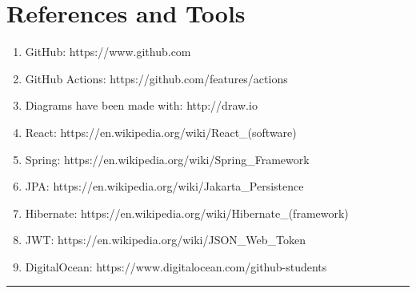 \documentclass{Configuration_Files/Template}
\begin{document}
\section{References and Tools}

\begin{enumerate}
    \item GitHub: https://www.github.com
    \item GitHub Actions: https://github.com/features/actions
    \item Diagrams have been made with: http://draw.io
    \item React: https://en.wikipedia.org/wiki/React\_(software)
    \item Spring: https://en.wikipedia.org/wiki/Spring\_Framework
    \item JPA: https://en.wikipedia.org/wiki/Jakarta\_Persistence
    \item Hibernate: https://en.wikipedia.org/wiki/Hibernate\_(framework)
    \item JWT: https://en.wikipedia.org/wiki/JSON\_Web\_Token
    \item DigitalOcean: https://www.digitalocean.com/github-students
\end{enumerate}

{\color{bluepoli}\rule{\linewidth}{0.1pt}}
\end{document}
